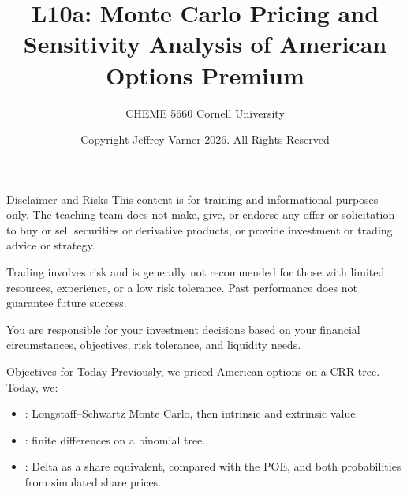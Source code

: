 \documentclass[aspectratio=169,11pt]{beamer}
\title{\texorpdfstring{{\vnheavy L10a}}{L10a}: Monte Carlo Pricing and Sensitivity Analysis of American Options Premium}
\subtitle{CHEME 5660 Cornell University}
\author{Copyright Jeffrey Varner 2026. All Rights Reserved}
\begin{document}
\vntitlepage

\begin{frame}{Disclaimer and Risks}
  \vspace{0.6em}
  \textbf{} This content is for training and informational
  purposes only. The teaching team does not make, give, or endorse any offer or
  solicitation to buy or sell securities or derivative products, or provide
  investment or trading advice or strategy.

  \vspace{1.1em}
  \textbf{} Trading involves risk and is generally not recommended for
  those with limited resources, experience, or a low risk tolerance. Past
  performance does not guarantee future success.

  \vspace{1.1em}
  \textbf{} You are responsible for your investment decisions
  based on your financial circumstances, objectives, risk tolerance, and
  liquidity needs.
\end{frame}

\begin{frame}{Objectives for Today}
  Previously, we priced American options on a CRR tree. Today, we:

  \vspace{0.5em}
  {\large\textbf{}}
  \begin{itemize}\setlength{\itemsep}{0.5em}
    \item {}:
      Longstaff--Schwartz Monte Carlo, then intrinsic and extrinsic value.
    \item {}: finite differences
      on a binomial tree.
    \item {}: Delta as a share equivalent, compared with the POE, and both
      probabilities from simulated share prices.
  \end{itemize}
\end{frame}
\end{document}
